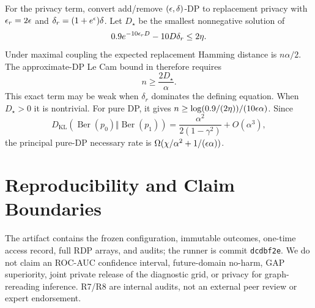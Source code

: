 For the privacy term, convert add/remove $(\epsilon,\delta)$-DP to replacement
privacy with $\epsilon_r=2\epsilon$ and
$\delta_r=(1+e^\epsilon)\delta$. Let $D_\star$ be the smallest nonnegative
solution of
\begin{equation}
 0.9e^{-10\epsilon_rD}-10D\delta_r\leq2\eta.
\end{equation}
Under maximal coupling the expected replacement Hamming distance is
$n\alpha/2$. The approximate-DP Le Cam bound in
\cite{acharya2021private} therefore requires
\begin{equation}
n\geq\frac{2D_\star}{\alpha}.
\end{equation}
This exact term may be weak when $\delta_r$ dominates the defining equation.
When $D_\star>0$ it is nontrivial. For pure DP, it gives
$n\geq\log(0.9/(2\eta))/(10\epsilon\alpha)$. Since
\begin{equation}
D_{\mathrm{KL}}(\operatorname{Ber}(p_0)
\Vert\operatorname{Ber}(p_1))
=\frac{\alpha^2}{2(1-\gamma^2)}+O(\alpha^3),
\end{equation}
the principal pure-DP necessary rate is
$\Omega(\chi/\alpha^2+1/(\epsilon\alpha))$.

\section{Reproducibility and Claim Boundaries}

The artifact contains the frozen configuration, immutable outcomes, one-time
access record, full RDP arrays, and audits; the runner is commit
\texttt{dcdbf2e}. We do not claim an ROC-AUC confidence interval, future-domain
no-harm, GAP superiority, joint private release of the diagnostic grid, or
privacy for graph-rereading inference. R7/R8 are internal audits, not an
external peer review or expert endorsement.
